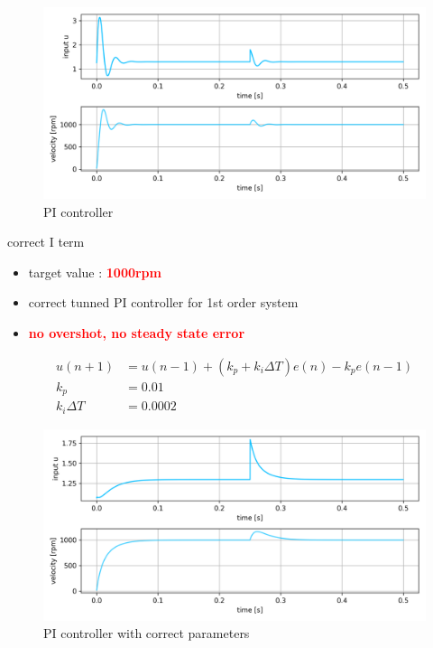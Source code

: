 \documentclass[12pt,twoside,onecolumn,openany,extrafontsizes,dvipsnames]{memoir}
\begin{document}
                
                \begin{figure}[!htb]
                    \centering
                    \includegraphics[scale=0.8]{../images/motor_control/pid_pi_control_0.png}
                    \caption{PI controller}
                    \label{fig:pi_controller}
                \end{figure}

                correct I term

                \begin{itemize}
                    \item  target value : \textcolor{red}{\textbf {1000rpm}}
                    \item  correct tunned PI controller for 1st order system
                    \item  \textcolor{red}{\textbf {no overshot, no steady state error}}
                \end{itemize}
                
                \begin{align}
                    u(n+1) &= u(n-1) + (k_p + k_i\Delta T) e(n) - k_pe(n-1) \\
                    k_p    &= 0.01 \\
                    k_i\Delta T    &= 0.0002
                \end{align}

                \begin{figure}[!htb]
                    \centering
                    \includegraphics[scale=0.8]{../images/motor_control/pid_pi_control_1.png}
                    \caption{PI controller with correct parameters}
                    \label{fig:pi_controller_correct}
                \end{figure}
                
\end{document}
